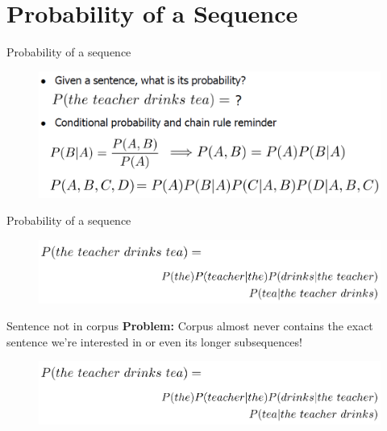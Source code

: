 \section{Probability of a Sequence}
\begin{frame}{Probability of a sequence}
    \begin{figure}
        \centering
        \includegraphics[width=\textwidth,height=0.8\textheight,keepaspectratio]{images/nlp-intro/prob-seq-1.png}
    \end{figure}
\end{frame}

\begin{frame}{Probability of a sequence}
    \begin{figure}
        \centering
        \includegraphics[width=\textwidth,height=0.8\textheight,keepaspectratio]{images/nlp-intro/prob-seq-2.png}
    \end{figure}
\end{frame}

\begin{frame}{Sentence not in corpus}
    \textbf{Problem:} Corpus almost never contains the exact sentence we’re interested in or even its longer subsequences! \\[1em]
    \begin{figure}
        \centering
        \includegraphics[width=\textwidth,height=0.7\textheight,keepaspectratio]{images/nlp-intro/prob-seq-2.png}
    \end{figure}
\end{frame}

